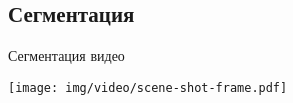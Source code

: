 

\subsection{Сегментация}

%

%
%


\begin{frame}{Сегментация видео}

    \begin{center}
        \texttt{[image: img/video/scene-shot-frame.pdf]}
    \end{center}


\end{frame}
